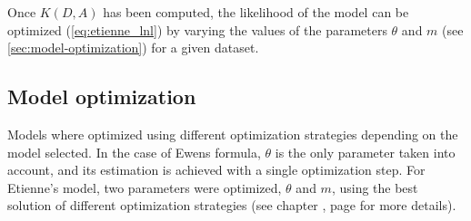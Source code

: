 Once $K(D,A)$ has been computed, the likelihood of the model can be optimized (\autoref{eq:etienne_lnl}) by varying the values of the parameters $\theta$ and $m$ (see  \autoref{sec:model-optimization}) for a given dataset.





\subsection{Model optimization}
\label{sec:model-optimization}

Models where optimized using different optimization strategies depending on the model selected. In the case of Ewens formula, $\theta$ is the only parameter taken into account, and its estimation is achieved with a single optimization step. For Etienne's model, two parameters were optimized, $\theta$ and $m$, using the best solution of different optimization strategies (see chapter \textbf{}, page \pageref{sec:ecolopy} for more details).

